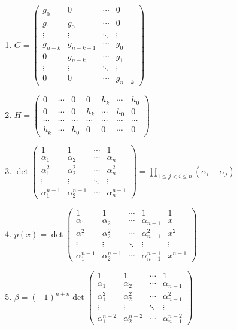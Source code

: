 \documentclass[oneside,10pt,]{article}
\newcommand{\lt}{<}
\begin{document}
\begin{enumerate}
\item{}\(\displaystyle G = \begin{pmatrix} g_0 & 0 & \cdots & 0 \\ g_1 & g_0 & \cdots & 0 \\ \vdots & \vdots &\ddots & \vdots \\ g_{n-k} & g_{n-k-1} & \cdots & g_0 \\ 0 & g_{n-k} & \cdots & g_{1} \\ \vdots & \vdots & \ddots & \vdots \\ 0 & 0 & \cdots & g_{n-k} \end{pmatrix}\)%
\item{}\(\displaystyle H = \begin{pmatrix} 0 & \cdots & 0 & 0 & h_k & \cdots & h_0 \\ 0 & \cdots & 0 & h_k & \cdots & h_0 & 0 \\ \cdots & \cdots & \cdots & \cdots & \cdots & \cdots & \cdots \\ h_k & \cdots & h_0 & 0 & 0 & \cdots & 0 \end{pmatrix}\)%
\item{}\(\displaystyle \det \begin{pmatrix} 1 & 1 & \cdots & 1 \\ \alpha_1 & \alpha_2 & \cdots & \alpha_n \\ \alpha_1^2 & \alpha_2^2 & \cdots & \alpha_n^2 \\ \vdots & \vdots & \ddots & \vdots \\ \alpha_1^{n-1} & \alpha_2^{n-1} & \cdots & \alpha_n^{n-1} \end{pmatrix} = \prod_{1 \leq j \lt i \leq n} (\alpha_i - \alpha_j)\)%
\item{}\(\displaystyle p(x) = \det \begin{pmatrix} 1 & 1 & \cdots & 1 & 1 \\ \alpha_1 & \alpha_2 & \cdots & \alpha_{n-1} & x \\ \alpha_1^2 & \alpha_2^2 & \cdots & \alpha_{n-1}^2 & x^2 \\ \vdots & \vdots & \ddots & \vdots & \vdots \\ \alpha_1^{n-1} & \alpha_2^{n-1} & \cdots & \alpha_{n-1}^{n-1} & x^{n-1} \end{pmatrix}\)%
\item{}\(\displaystyle \beta = (-1)^{n + n} \det \begin{pmatrix} 1 & 1 & \cdots & 1 \\ \alpha_1 & \alpha_2 & \cdots & \alpha_{n-1} \\ \alpha_1^2 & \alpha_2^2 & \cdots & \alpha_{n-1}^2 \\ \vdots & \vdots & \ddots & \vdots \\ \alpha_1^{n-2} & \alpha_2^{n-2} & \cdots & \alpha_{n-1}^{n-2} \end{pmatrix}\)%

\end{enumerate}
\end{document}

